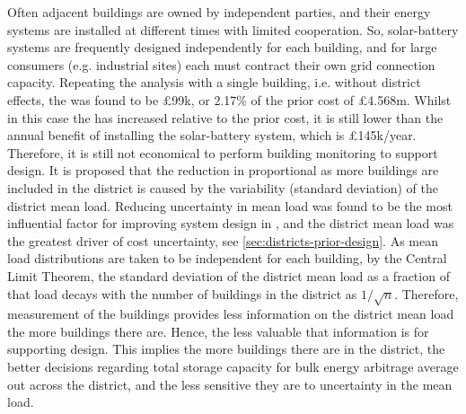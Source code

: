 Often adjacent buildings are owned by independent parties, and their energy systems are installed at different times with limited cooperation. So, solar-battery systems are frequently designed independently for each building, and for large consumers (e.g. industrial sites) each must contract their own grid connection capacity. Repeating the  analysis with a single building, i.e. without district effects, the  was found to be £99k, or 2.17\% of the prior cost of £4.568m. Whilst in this case the  has increased relative to the prior cost, it is still lower than the annual benefit of installing the solar-battery system, which is £145k/year. Therefore, it is still not economical to perform building monitoring to support design. It is proposed that the reduction in proportional  as more buildings are included in the district is caused by the variability (standard deviation) of the district mean load. Reducing uncertainty in mean load was found to be the most influential factor for improving system design in , and the district mean load was the greatest driver of cost uncertainty, see \cref{sec:districts-prior-design}. As mean load distributions are taken to be independent for each building, by the Central Limit Theorem, the standard deviation of the district mean load as a fraction of that load decays with the number of buildings in the district as $1/\sqrt{n}$. Therefore, measurement of the buildings provides less information on the district mean load the more buildings there are. Hence, the less valuable that information is for supporting design. This implies the more buildings there are in the district, the better decisions regarding total storage capacity for bulk energy arbitrage average out across the district, and the less sensitive they are to uncertainty in the mean load.

